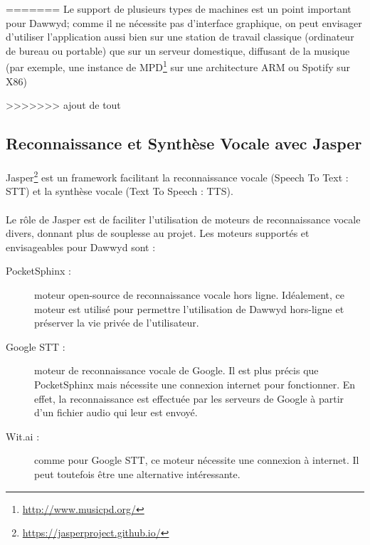 \documentclass[12pt]{article}
\begin{document}
=======
	    Le support de plusieurs types de machines est un point important pour Dawwyd; comme il ne nécessite pas d'interface graphique, on peut envisager d'utiliser l'application aussi bien sur une station de travail classique (ordinateur de bureau ou portable) que sur un serveur domestique, diffusant de la musique (par exemple, une instance de \label{mpd} MPD\footnote{\url{http://www.musicpd.org/}} sur une architecture ARM ou Spotify sur X86)
	    
>>>>>>> ajout de tout
	    \subsection{Reconnaissance et Synthèse Vocale avec Jasper}
        \paragraph{}
        Jasper\footnote{\url{https://jasperproject.github.io/}} est un
        framework facilitant la reconnaissance vocale (Speech To Text : STT) et
        la synthèse vocale (Text To Speech : TTS).

	    \paragraph{}
        Le rôle de Jasper est de faciliter l'utilisation de moteurs de
        reconnaissance vocale divers, donnant plus de souplesse au projet. Les
        moteurs supportés et envisageables pour Dawwyd sont :

	    \begin{description}

	    	\item[PocketSphinx :] moteur open-source de reconnaissance vocale hors ligne. Idéalement, ce moteur est utilisé pour permettre l'utilisation de Dawwyd hors-ligne et préserver la vie privée de l'utilisateur.
	    	\item[Google STT :] moteur de reconnaissance vocale de Google. Il est plus précis que PocketSphinx mais nécessite une connexion internet pour fonctionner. En effet, la reconnaissance est effectuée par les serveurs de Google à partir d'un fichier audio qui leur est envoyé.
	    	\item[Wit.ai :] comme pour Google STT, ce moteur nécessite une connexion à internet. Il peut toutefois être une alternative intéressante.

	    \end{description}
\end{document}
